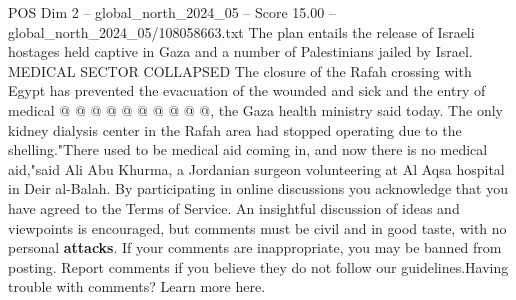 \begin{textsample}{POS Dim 2 – global\_north\_2024\_05 – Score 15.00 – global\_north\_2024\_05/108058663.txt}
The plan entails the release of Israeli hostages held captive in Gaza and a number of Palestinians jailed by Israel.
MEDICAL SECTOR COLLAPSED The closure of the Rafah crossing with Egypt has prevented the evacuation of the wounded and sick and the entry of medical @ @ @ @ @ @ @ @ @ @, the Gaza health ministry said today.
The only kidney dialysis center in the Rafah area had stopped operating due to the shelling."There used to be medical aid coming in, and now there is no medical aid,"said Ali Abu Khurma, a Jordanian surgeon volunteering at Al Aqsa hospital in Deir al-Balah.
By participating in online discussions you acknowledge that you have agreed to the Terms of Service.
An insightful discussion of ideas and viewpoints is encouraged, but comments must be civil and in good taste, with no personal \textbf{attacks}.
If your comments are inappropriate, you may be banned from posting.
Report comments if you believe they do not follow our guidelines.Having trouble with comments?
Learn more here.

\end{textsample}
